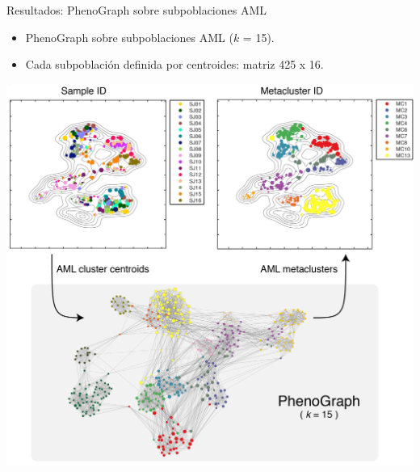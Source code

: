   \begin{frame}{Resultados: PhenoGraph sobre subpoblaciones AML}
    \begin{itemize}
      \item PhenoGraph sobre subpoblaciones AML ($k$ = 15).
      \item Cada subpoblación definida por centroides: matriz 425 x 16.
    \end{itemize}
    \centering
    \includegraphics[scale=0.52]{images/AML_subpoblations.jpg}
  \end{frame}
  
